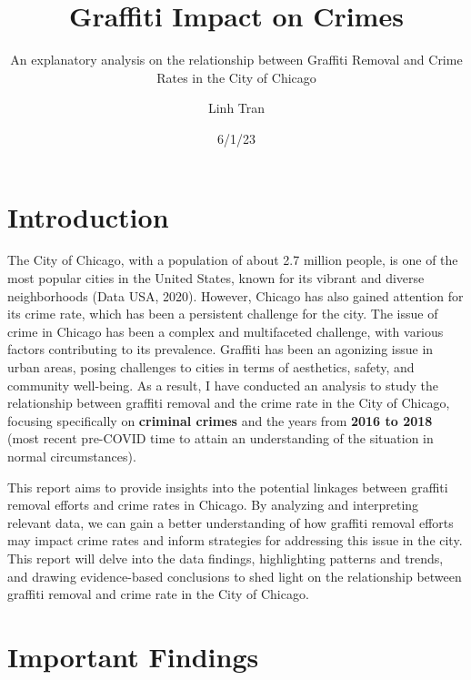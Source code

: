 \documentclass[
]{report}
\title{Graffiti Impact on Crimes}
\subtitle{An explanatory analysis on the relationship between Graffiti
Removal and Crime Rates in the City of Chicago}
\author{Linh Tran}
\date{6/1/23}
\renewcommand*\contentsname{Table of contents}
\newcommand\contentsname{Table of contents}
\begin{document}
\maketitle
\ifdefined\Shaded\renewenvironment{Shaded}{\begin{tcolorbox}[borderline west={3pt}{0pt}{shadecolor}, interior hidden, breakable, frame hidden, sharp corners, enhanced, boxrule=0pt]}{\end{tcolorbox}}\fi

\renewcommand*\contentsname{Table of contents}
{
\hypersetup{linkcolor=}
\setcounter{tocdepth}{2}
\tableofcontents
}
\hypertarget{introduction}{%
\section{Introduction}\label{introduction}}

The City of Chicago, with a population of about 2.7 million people, is
one of the most popular cities in the United States, known for its
vibrant and diverse neighborhoods (Data USA, 2020). However, Chicago has
also gained attention for its crime rate, which has been a persistent
challenge for the city. The issue of crime in Chicago has been a complex
and multifaceted challenge, with various factors contributing to its
prevalence. Graffiti has been an agonizing issue in urban areas, posing
challenges to cities in terms of aesthetics, safety, and community
well-being. As a result, I have conducted an analysis to study the
relationship between graffiti removal and the crime rate in the City of
Chicago, focusing specifically on \textbf{criminal crimes} and the years
from \textbf{2016 to 2018} (most recent pre-COVID time to attain an
understanding of the situation in normal circumstances).

This report aims to provide insights into the potential linkages between
graffiti removal efforts and crime rates in Chicago. By analyzing and
interpreting relevant data, we can gain a better understanding of how
graffiti removal efforts may impact crime rates and inform strategies
for addressing this issue in the city. This report will delve into the
data findings, highlighting patterns and trends, and drawing
evidence-based conclusions to shed light on the relationship between
graffiti removal and crime rate in the City of Chicago.

\hypertarget{important-findings}{%
\section{Important Findings}\label{important-findings}}
\end{document}
